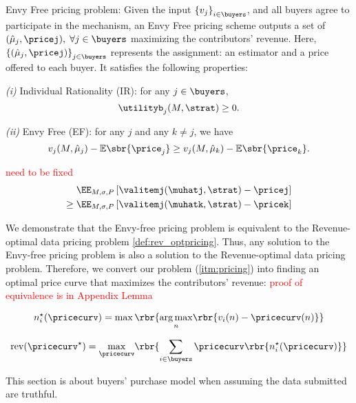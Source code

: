 \begin{definition}
    Envy Free pricing problem: Given the input $\left\{ v_j \right\}_{i \in \buyers} $, and all buyers agree to participate in the mechanism, an Envy Free pricing scheme outputs a set of $(\hat{\mu}_j,\pricej), \; \forall j \in \buyers$ maximizing the contributors' revenue. Here,  $\left\{(\hat{\mu}_j,\pricej)\right\}_{j \in \buyers}$ represents the assignment: an estimator and a price offered to each buyer. It satisfies the following properties:

    \emph{(i)} Individual Rationality (IR): for any $j \in \buyers$, \[ \utilityb_j(M,\strat)\geq 0 .\] 

    \emph{(ii)} Envy Free (EF): for any $j$ and any $k \neq j$, we have 
    \[ v_j(M, \hat{\mu}_j) -\mathbb{E}\sbr{\price_j} \geq   v_j(M, \hat{\mu}_k) -\mathbb{E}\sbr{\price_k}. \]    

\textcolor{red}{need to be fixed}
     \begin{align*}
         \EE_{M, \sigma, P}\left[ \valitemj(\muhatj, \strat) - \pricej \right]  \\ \geq  \EE_{M, \sigma, P}\left[ \valitemj(\muhatk, \strat) - \pricek \right] 
     \end{align*}
     
\end{definition}



We demonstrate that the Envy-free pricing problem is equivalent to the Revenue-optimal data pricing problem \ref{def:rev_optpricing}. Thus, any solution to the Envy-free pricing problem is also a solution to the Revenue-optimal data pricing problem. Therefore, we convert our problem (\ref{itm:pricing}) into finding an optimal price curve that maximizes the contributors' revenue: \textcolor{red}{proof of equivalence is in Appendix Lemma}

    \begin{align*}
        n^{\star}_i(\pricecurv) = \max \rbr{\underset{n}{\arg\max} \rbr{v_i(n)-\pricecurv(n) }}
    \end{align*}

    \begin{align*}
       \mathrm{rev}(\pricecurv^{\star}) = \underset{\pricecurv}{\max} \rbr{\sum_{i \in \buyers} \pricecurv \rbr{ n^{\star}_i(\pricecurv) }}
    \end{align*}



This section is about buyers' purchase model when assuming the data submitted are truthful. 


